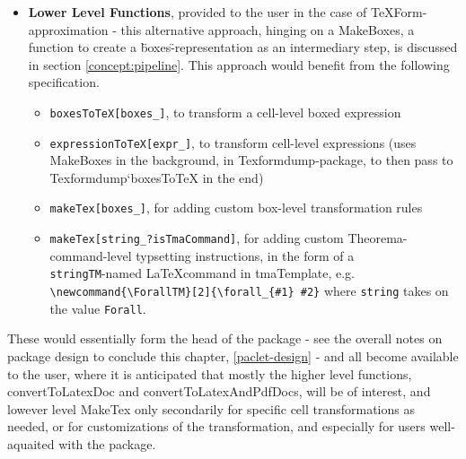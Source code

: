\begin{itemize}
    \item \textbf{Lower Level Functions}, provided to the user in the case of TeXForm-approximation - this alternative approach, hinging on a MakeBoxes, a function to create a \"boxes\"-representation as an intermediary step, is discussed in section \ref{concept:pipeline}. This approach would benefit from the following specification.
    \begin{itemize}
        \item \texttt{boxesToTeX[boxes\_]}, to transform a cell-level boxed expression
        \item \texttt{expressionToTeX[expr\_]}, to transform cell-level expressions (uses MakeBoxes \cite{wolfram_research_inc_makeboxeswolfram_nodate} in the background, in Texformdump-package, to then pass to Texformdump`boxesToTeX in the end) 
        \item \texttt{makeTex[boxes\_]}, for adding custom box-level transformation rules
        \item \texttt{makeTex[string\_?isTmaCommand]}, for adding custom Theorema-command-level typsetting instructions, in the form of a \texttt{\\stringTM}-named \LaTeX command in tmaTemplate, e.g. \verb|\newcommand{\ForallTM}[2]{\forall_{#1} #2}| where \texttt{string} takes on the value \texttt{Forall}.
    \end{itemize}

\end{itemize}

These would essentially form the head of the package - see the overall notes on package design to conclude this chapter, \ref{paclet-design} - and all become available to the user, where it is anticipated that mostly the higher level functions, convertToLatexDoc and convertToLatexAndPdfDocs, will be of interest, and lowever level MakeTex only secondarily for specific cell transformations as needed, or for customizations of the transformation, and especially for users well-aquaited with the package.

